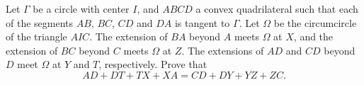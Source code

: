 Let $\Gamma$ be a circle with center $I$, and $ABCD$ a convex quadrilateral
such that each of the segments $AB$, $BC$, $CD$ and $DA$ is tangent to $\Gamma$.
Let $\Omega$ be the circumcircle of the triangle $AIC$.
The extension of $BA$ beyond $A$ meets $\Omega$ at $X$,
and the extension of $BC$ beyond $C$ meets $\Omega$ at $Z$.
The extensions of $AD$ and $CD$ beyond $D$ meet $\Omega$ at $Y$ and $T$, respectively.
Prove that
\[ AD + DT + TX + XA = CD + DY + YZ + ZC. \]